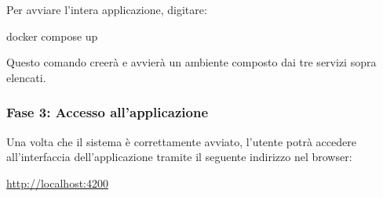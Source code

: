 Per avviare l'intera applicazione, digitare:

\begin{center}
docker compose up
\end{center}
\noindent
Questo comando creerà e avvierà un ambiente composto dai tre servizi sopra elencati.

\subsubsection{Fase 3: Accesso all'applicazione}

Una volta che il sistema è correttamente avviato, l'utente potrà accedere all'interfaccia dell'applicazione tramite il seguente indirizzo nel browser:

\begin{center}
\url{http://localhost:4200}
\end{center}

